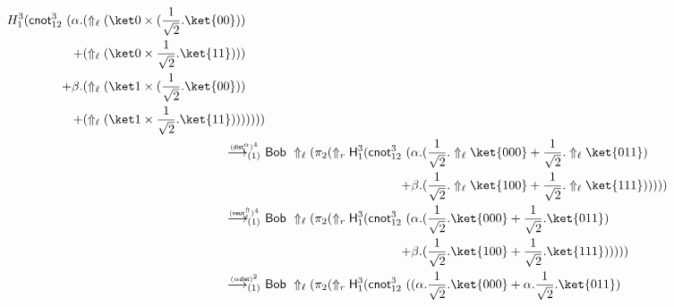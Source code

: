 \documentclass[preprint]{elsarticle}
\newcommand\lra[1][1]{\longrightarrow_{\left(#1\right)}}
\newcommand\pair[2]{({#1}+{#2})}
\newcommand\s[1]{\ensuremath{\mathsf{#1}}}
\newcommand\red[2][1]{\overset{\scriptscriptstyle\smash{#2}\vphantom{x}}{\lra[#1]}\ }
\newcommand\rdists{(\s{\alpha dist})}
\newcommand\rcaneutl{(\s{neut^\Uparrow_\ell})}
\newcommand\rdistscall{(\s{dist^\alpha_l})}
\begin{document}
\begin{align*}
\begin{aligned}[t]
                         H_1^3(\s{cnot}_{12}^3\ ( \alpha.& (\Uparrow_\ell (\ket
                         0\times(\frac 1{\sqrt 2}.\ket{00}))
                         \\
                         +& (\Uparrow_\ell (\ket 0\times\frac 1{\sqrt
                           2}.\ket{11})))
                         \\
                         + \beta. & (\Uparrow_\ell (\ket 1\times(\frac 1{\sqrt
                           2}.\ket{00}))
                         \\
                         +& (\Uparrow_\ell (\ket 1\times\frac 1{\sqrt
                           2}.\ket{11}))) ) )))
                       \end{aligned}
  \\
  \red{\rdistscall^4} &
                        \begin{aligned}[t]
                          \s{Bob}\ \Uparrow_\ell(\pi_2(\Uparrow_r \s
                          H_1^3(\s{cnot}_{12}^3\ ( \alpha.& \pair {\frac 1{\sqrt
                              2}.\Uparrow_\ell \ket{000}} {\frac 1{\sqrt
                              2}.\Uparrow_\ell \ket{011}}
                          \\
                          + \beta. & \pair {\frac 1{\sqrt
                              2}.\Uparrow_\ell \ket{100}} {\frac 1{\sqrt
                              2}.\Uparrow_\ell \ket{111}} ))))
                        \end{aligned}
  \\
  \red{\rcaneutl^4} &
                      \begin{aligned}[t]
                        \s{Bob}\ \Uparrow_\ell(\pi_2(\Uparrow_r \s
                        H_1^3(\s{cnot}_{12}^3\ ( \alpha.& \pair {\frac 1{\sqrt
                            2}.\ket{000}} {\frac 1{\sqrt 2}.\ket{011}}
                        \\
                        + \beta. & \pair {\frac 1{\sqrt 2}.\ket{100}} {\frac
                          1{\sqrt 2}.\ket{111}} ))))
                      \end{aligned}
  \\
  \red{\rdists^2} &
                    \begin{aligned}[t]
                      \s{Bob}\ \Uparrow_\ell(\pi_2(\Uparrow_r \s
                      H_1^3(\s{cnot}_{12}^3\ ( & \pair {\alpha.\frac 1{\sqrt
                          2}.\ket{000}} {\alpha.\frac 1{\sqrt 2}.\ket{011}}
                      \\

\end{aligned}
\end{align*}
\end{document}
